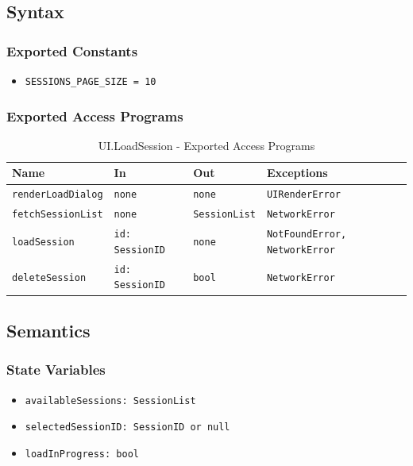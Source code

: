 \documentclass[12pt, titlepage]{article}
\begin{document}
\subsection{Syntax}

\subsubsection{Exported Constants}
\begin{itemize}
    \item \texttt{SESSIONS\_PAGE\_SIZE = 10}
\end{itemize}

\subsubsection{Exported Access Programs}

\begin{table}[H]
\centering
\small
\caption{UI.LoadSession - Exported Access Programs}
\begin{tabular}{p{3.5cm} p{3.2cm} p{3.2cm} p{4.1cm}}
\toprule
\textbf{Name} & \textbf{In} & \textbf{Out} & \textbf{Exceptions} \\
\midrule
\texttt{renderLoadDialog} & \texttt{none} & \texttt{none} & \texttt{UIRenderError} \\
\texttt{fetchSessionList} & \texttt{none} & \texttt{SessionList} & \texttt{NetworkError} \\
\texttt{loadSession} & \texttt{id: SessionID} & \texttt{none} & \texttt{NotFoundError, NetworkError} \\
\texttt{deleteSession} & \texttt{id: SessionID} & \texttt{bool} & \texttt{NetworkError} \\
\bottomrule
\end{tabular}
\end{table}

\subsection{Semantics}

\subsubsection{State Variables}
\begin{itemize}
    \item \texttt{availableSessions: SessionList}
    \item \texttt{selectedSessionID: SessionID or null}
    \item \texttt{loadInProgress: bool}
\end{itemize}
\end{document}

